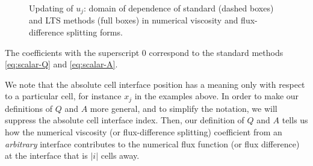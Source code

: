 \begin{figure}[h!]
	\centering	
	

	
	\captionsetup{justification=centering}
	
	\caption{Updating of $ u_j $: domain of dependence of standard (dashed boxes) and LTS methods (full boxes) in numerical viscosity and flux-difference splitting forms.}
	\label{fig:LTS-methods}
\end{figure} 

The coefficients with the superscript $ 0 $ correspond to the standard methods \eqref{eq:scalar-Q} and \eqref{eq:scalar-A}.

\begin{remark} \label{rem:indexing}
\textup{We note that the absolute cell interface position has a meaning only with respect to a particular cell, for instance $ x_j $ in the examples above. In order to make our definitions of $ Q $ and $ A $ more general, and to simplify the notation, we will suppress the absolute cell interface index. Then, our definition of $ Q $ and $ A $ tells us how the numerical viscosity (or flux-difference splitting) coefficient from an \textit{arbitrary} interface contributes to the numerical flux function (or flux difference) at the interface that is $ |i| $ cells away.
}
\end{remark}

